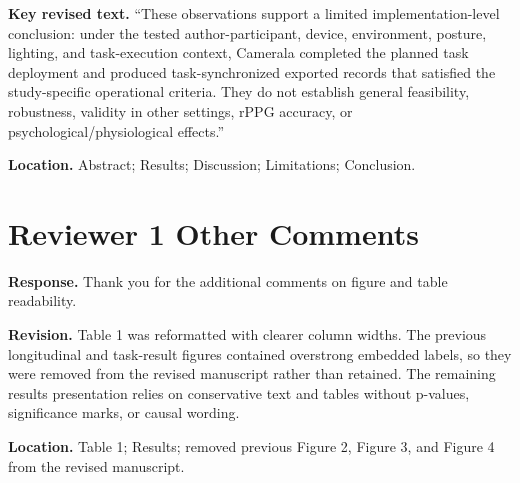 \documentclass[11pt]{article}
\begin{document}
\textbf{Key revised text.}
``These observations support a limited implementation-level conclusion: under the tested author-participant, device, environment, posture, lighting, and task-execution context, Camerala completed the planned task deployment and produced task-synchronized exported records that satisfied the study-specific operational criteria. They do not establish general feasibility, robustness, validity in other settings, rPPG accuracy, or psychological/physiological effects.''

\textbf{Location.}
Abstract; Results; Discussion; Limitations; Conclusion.

\section*{Reviewer 1 Other Comments}
\textbf{Response.}
Thank you for the additional comments on figure and table readability.

\textbf{Revision.}
Table 1 was reformatted with clearer column widths.
The previous longitudinal and task-result figures contained overstrong embedded labels, so they were removed from the revised manuscript rather than retained.
The remaining results presentation relies on conservative text and tables without p-values, significance marks, or causal wording.

\textbf{Location.}
Table 1; Results; removed previous Figure 2, Figure 3, and Figure 4 from the revised manuscript.
\end{document}
